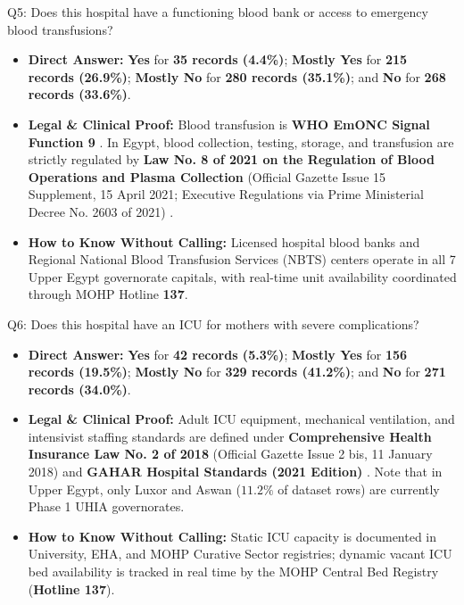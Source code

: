 \documentclass[10pt,a4paper]{article}
\begin{document}
\begin{qabox}{Q5: Does this hospital have a functioning blood bank or access to emergency blood transfusions?}
\begin{itemize}
    \item \textbf{Direct Answer:} \textbf{Yes} for \textbf{35 records (4.4\%)}; \textbf{Mostly Yes} for \textbf{215 records (26.9\%)}; \textbf{Mostly No} for \textbf{280 records (35.1\%)}; and \textbf{No} for \textbf{268 records (33.6\%)}.
    \item \textbf{Legal \& Clinical Proof:} Blood transfusion is \textbf{WHO EmONC Signal Function 9} \cite{who2009emonc}. In Egypt, blood collection, testing, storage, and transfusion are strictly regulated by \textbf{Law No. 8 of 2021 on the Regulation of Blood Operations and Plasma Collection} (Official Gazette Issue 15 Supplement, 15 April 2021; Executive Regulations via Prime Ministerial Decree No. 2603 of 2021) \cite{egypt_law_8_2021_blood}.
    \item \textbf{How to Know Without Calling:} Licensed hospital blood banks and Regional National Blood Transfusion Services (NBTS) centers operate in all 7 Upper Egypt governorate capitals, with real-time unit availability coordinated through MOHP Hotline \textbf{137}.
\end{itemize}
\end{qabox}

\begin{qabox}{Q6: Does this hospital have an ICU for mothers with severe complications?}
\begin{itemize}
    \item \textbf{Direct Answer:} \textbf{Yes} for \textbf{42 records (5.3\%)}; \textbf{Mostly Yes} for \textbf{156 records (19.5\%)}; \textbf{Mostly No} for \textbf{329 records (41.2\%)}; and \textbf{No} for \textbf{271 records (34.0\%)}.
    \item \textbf{Legal \& Clinical Proof:} Adult ICU equipment, mechanical ventilation, and intensivist staffing standards are defined under \textbf{Comprehensive Health Insurance Law No. 2 of 2018} (Official Gazette Issue 2 bis, 11 January 2018) \cite{egypt_law_2_2018_uhia} and \textbf{GAHAR Hospital Standards (2021 Edition)} \cite{gahar2021hospital}. Note that in Upper Egypt, only Luxor and Aswan ($11.2\%$ of dataset rows) are currently Phase 1 UHIA governorates.
    \item \textbf{How to Know Without Calling:} Static ICU capacity is documented in University, EHA, and MOHP Curative Sector registries; dynamic vacant ICU bed availability is tracked in real time by the MOHP Central Bed Registry (\textbf{Hotline 137}).
\end{itemize}
\end{qabox}
\end{document}
